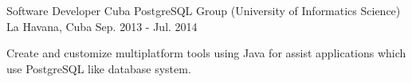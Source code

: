 \begin{cventries}

\cventry
{Software Developer} %
{Cuba PostgreSQL Group (University of Informatics Science)} %
{La Havana, Cuba} %
{Sep. 2013 - Jul. 2014} %
{ %
\begin{cvitems}
\item {Create and customize multiplatform tools using Java for assist applications which use PostgreSQL like database system.}
\end{cvitems}
}


\end{cventries}

